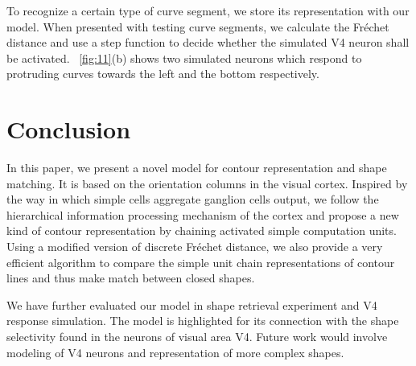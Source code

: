 \documentclass[10pt,letterpaper]{article}
\begin{document}
To recognize a certain type of curve segment,
we store its representation with our model.
When presented with testing curve segments,
we calculate the Fr\'echet distance 
and use a step function to decide whether the simulated V4 neuron shall be activated.
\figurename~\ref{fig:11}(b) shows two simulated neurons
which respond to protruding curves towards the left and the bottom respectively.

\section{Conclusion}

In this paper, we present a novel model for contour representation and shape matching.
It is based on the orientation columns in the visual cortex.
Inspired by the way in which simple cells aggregate ganglion cells output,
we follow the hierarchical information processing mechanism of the cortex
and propose a new kind of contour representation by chaining activated simple computation units.
Using a modified version of discrete Fr\'echet distance,
we also provide a very efficient algorithm to compare the simple unit chain representations of contour lines
and thus make match between closed shapes.

We have further evaluated our model in shape retrieval experiment and V4 response simulation.
The model is highlighted for its connection with the shape selectivity found in the neurons of visual area V4. 
Future work would involve modeling of V4 neurons and representation of more complex shapes.




\setlength{\bibleftmargin}{.125in}
\setlength{\bibindent}{-\bibleftmargin}


\end{document}
